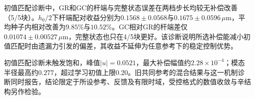 

初值匹配诊断中，GR和GC的杆端与完整状态误差在两档步长均较无补偿改善（5/5块）。$h_0/2$下杆端配对收益分别为$0.1568\pm0.0568$与$0.1675\pm0.0596\,\mu\mathrm m$，平均种子内相对改善为$9.85\%$与$10.52\%$。GC相对GR的杆端差仅$0.01074\pm0.00527\,\mu\mathrm m$，完整状态也只在4/5块更好。该诊断说明所选补偿能减小初值匹配时由遗漏力引发的偏差，其收益不延伸为任意参考下的稳定控制优势。

初值匹配诊断未触发饱和，峰值$|u|=0.0521$，最大补偿幅值约$2.28\times10^{-4}$；模态半径最高约$0.277$，超过学习初值上限$0.20$。旧共同参考的混合结果与这一机制诊断同时报告，结论限定于所设参考、反馈及有限时域，受控格式的数值收敛与辛结构另作检验。

